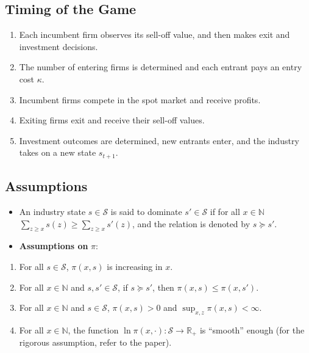 \documentclass[
]{book}
\providecommand{\tightlist}{%
  \setlength{\itemsep}{0pt}\setlength{\parskip}{0pt}}
\begin{document}
\hypertarget{timing-of-the-game-1}{%
\subsection{Timing of the Game}\label{timing-of-the-game-1}}

\begin{enumerate}
\def\labelenumi{\arabic{enumi}.}
\tightlist
\item
  Each incumbent firm observes its sell-off value, and then makes exit
  and investment decisions.
\item
  The number of entering firms is determined and each entrant pays an
  entry cost \(\kappa\).
\item
  Incumbent firms compete in the spot market and receive profits.
\item
  Exiting firms exit and receive their sell-off values.
\item
  Investment outcomes are determined, new entrants enter, and the
  industry takes on a new state \(s_{t + 1}\).
\end{enumerate}

\hypertarget{assumptions}{%
\subsection{Assumptions}\label{assumptions}}

\begin{itemize}
\tightlist
\item
  An industry state \(s \in \mathcal{S}\) is said to dominate
  \(s' \in \mathcal{S}\) if for all \(x \in \mathbb{N}\)
  \(\sum_{z \ge x} s(z) \ge \sum_{z \ge x} s'(z)\), and the relation is
  denoted by \(s \succeq s'\).
\item
  \textbf{Assumptions on} \(\pi\):
\end{itemize}

\begin{enumerate}
\def\labelenumi{\arabic{enumi}.}
\tightlist
\item
  For all \(s \in \mathcal{S}\), \(\pi(x, s)\) is increasing in \(x\).
\item
  For all \(x \in \mathbb{N}\) and \(s, s' \in \mathcal{S}\), if
  \(s \succeq s'\), then \(\pi(x, s) \le \pi(x, s')\).
\item
  For all \(x \in \mathbb{N}\) and \(s \in \mathcal{S}\), \(\pi(x, s) > 0\)
  and \(\sup_{x, z} \pi(x, s) < \infty\).
\item
  For all \(x \in \mathbb{N}\), the function
  \(\ln \pi(x, \cdot): \mathcal{S} \to \mathbb{R}_+\) is ``smooth'' enough
  (for the rigorous assumption, refer to the paper).
\end{enumerate}
\end{document}

